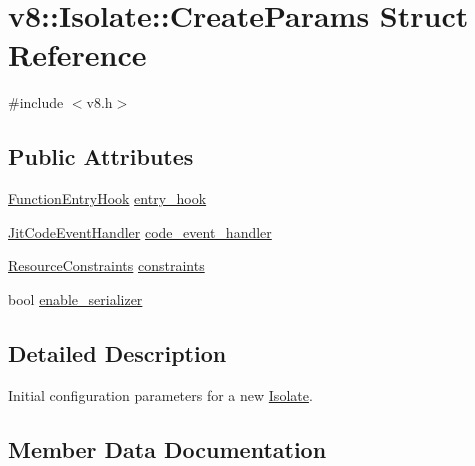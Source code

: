 \hypertarget{structv8_1_1_isolate_1_1_create_params}{}\section{v8\+:\+:Isolate\+:\+:Create\+Params Struct Reference}
\label{structv8_1_1_isolate_1_1_create_params}


{\ttfamily \#include $<$v8.\+h$>$}

\subsection*{Public Attributes}
\begin{DoxyCompactItemize}
\item 
\hyperlink{namespacev8_aaf07fb6bb13f295da3c6568938b7dec5}{Function\+Entry\+Hook} \hyperlink{structv8_1_1_isolate_1_1_create_params_aa7aa18bbe2d86713e5b074a93b38dc60}{entry\+\_\+hook}
\item 
\hyperlink{namespacev8_a39243bc91e63d64d111452fdb98c4733}{Jit\+Code\+Event\+Handler} \hyperlink{structv8_1_1_isolate_1_1_create_params_a783e3eba90ce6e2800bdd69197bbccdd}{code\+\_\+event\+\_\+handler}
\item 
\hyperlink{classv8_1_1_resource_constraints}{Resource\+Constraints} \hyperlink{structv8_1_1_isolate_1_1_create_params_a2c570b306aa8c1c24cfe70e8eee50fa1}{constraints}
\item 
bool \hyperlink{structv8_1_1_isolate_1_1_create_params_a6dae371b4c28bf7e8b3534dc24f13323}{enable\+\_\+serializer}
\end{DoxyCompactItemize}


\subsection{Detailed Description}
Initial configuration parameters for a new \hyperlink{classv8_1_1_isolate}{Isolate}. 

\subsection{Member Data Documentation}
\hypertarget{structv8_1_1_isolate_1_1_create_params_a783e3eba90ce6e2800bdd69197bbccdd}{}
